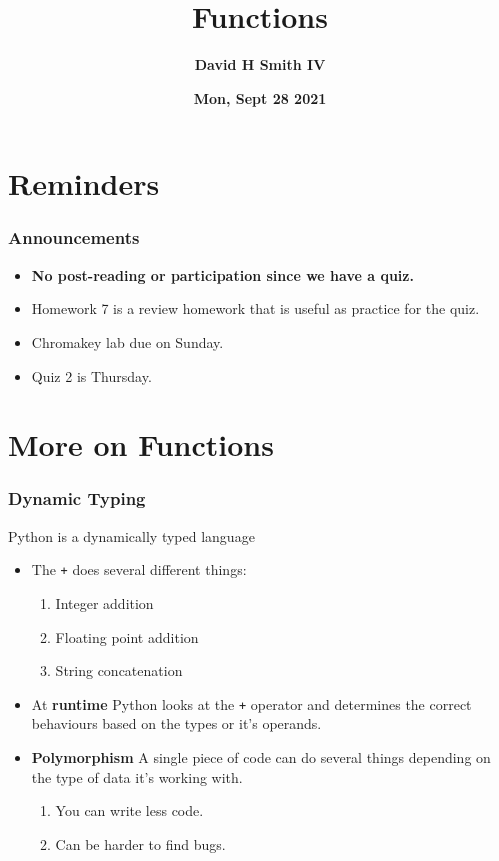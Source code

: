 \documentclass{beamer}
\title{\textbf{Functions}}
\author{\textbf{David H Smith IV}}
\institute[\textbf{UIUC}]{\textbf{University of Illinois Urbana-Champaign}}
\date{\textbf{Mon, Sept 28 2021}}
\begin{document}
\frame{\titlepage}

%
%
\section{Reminders}
\begin{frame}
  \frametitle{Announcements}
  \begin{itemize}
    \item \textbf{No post-reading or participation since we have a quiz.}
    \item Homework 7 is a review homework that is useful as practice for the quiz.
    \item Chromakey lab due on Sunday.
    \item Quiz 2 is Thursday.
  \end{itemize}
\end{frame}

\section{More on Functions}

%
%
\begin{frame}[fragile]
  \frametitle{Dynamic Typing}
  Python is a dynamically typed language
  \begin{itemize}
    \item The \lstinline|+| does several different things:
      \begin{enumerate}
        \item Integer addition
        \item Floating point addition
        \item String concatenation
      \end{enumerate}
    \item At \textbf{runtime} Python looks at the \lstinline|+| operator and determines the correct behaviours based on the types or it's operands.
    \item \textbf{Polymorphism} \textrightarrow A single piece of code can do several things depending on the type of data it's working with.
      \begin{enumerate}
        \item You can write less code.
        \item Can be harder to find bugs.
      \end{enumerate}

  \end{itemize}
\end{frame}
\end{document}
